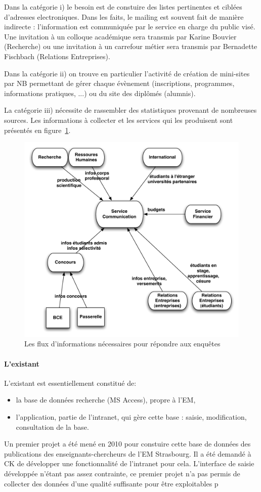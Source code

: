 \documentclass{book}
\begin{document}
Dans la catégorie i) le besoin est de constuire des listes pertinentes 
et ciblées d'adresses electroniques. Dans les faits, le mailing est
souvent fait de manière indirecte : l'information est communiquée par
le service en charge du public visé. Une invitation à un colloque académique
sera transmis par Karine Bouvier (Recherche) ou une invitation à un
carrefour métier sera transmis par Bernadette Fischbach (Relations Entreprises).

Dans la catégorie ii) on trouve en particulier l'activité de création
de mini-sites par NB permettant de gérer chaque évènement (inscriptions,
programmes, informations pratiques, ...) ou du site des diplômés (alumnis).


La catégorie iii) nécessite de rassembler des statistiques provenant de 
nombreuses sources. Les informations à collecter et les services qui les 
produisent sont présentés en figure~\ref{fg:comm_flux}.
\begin{figure}[hbt]
\begin{center}
\includegraphics[width=.75\linewidth]{figs/comm_flux.pdf}
\end{center}
\label{fg:comm_flux}
\caption{Les flux d'informations nécessaires pour répondre aux enquêtes}
\end{figure}



\paragraph{L'existant}
L'existant est essentiellement constitué de:
\begin{itemize}
\item la base de données recherche (MS Access), propre à l'EM,
\item l'application, partie de l'intranet, qui gère cette base : saisie, 
modification, consultation de la base.
\end{itemize}
Un premier projet a été mené en 2010 pour constuire cette base de données des
publications des enseignants-chercheurs de l'EM Strasbourg. Il a été demandé à 
CK de développer une fonctionnalité de l'intranet pour cela. L'interface de 
saisie développée n'étant pas assez contrainte, ce premier projet n'a pas 
permis de collecter des données d'une qualité suffisante pour être exploitables
p
\end{document}
